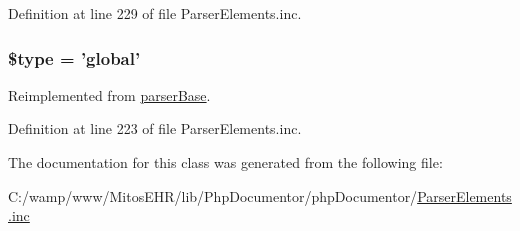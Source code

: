 \-Definition at line 229 of file \-Parser\-Elements.\-inc.

\hypertarget{classparser_global_a9a4a6fba2208984cabb3afacadf33919}{
\subsubsection[{\$type}]{\setlength{\rightskip}{0pt plus 5cm}\$type = 'global'}}\label{classparser_global_a9a4a6fba2208984cabb3afacadf33919}


\-Reimplemented from \hyperlink{classparser_base_a9a4a6fba2208984cabb3afacadf33919}{parser\-Base}.



\-Definition at line 223 of file \-Parser\-Elements.\-inc.



\-The documentation for this class was generated from the following file\-:\begin{DoxyCompactItemize}
\item 
\-C\-:/wamp/www/\-Mitos\-E\-H\-R/lib/\-Php\-Documentor/php\-Documentor/\hyperlink{_parser_elements_8inc}{\-Parser\-Elements.\-inc}\end{DoxyCompactItemize}
